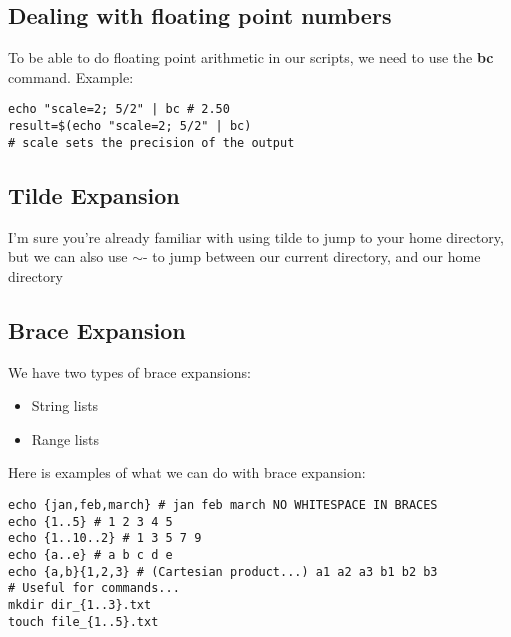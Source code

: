 \documentclass{report}
\begin{document}
    
    \bigbreak \noindent 
    \subsection{Dealing with floating point numbers}
    \bigbreak \noindent 
    To be able to do floating point arithmetic in our scripts, we need to use the \textbf{bc} command.
    \bigbreak \noindent 
    Example:
    
    \begin{verbatim}
echo "scale=2; 5/2" | bc # 2.50
result=$(echo "scale=2; 5/2" | bc)
# scale sets the precision of the output
    \end{verbatim}
    \bigbreak \noindent
    
    \bigbreak \noindent 

    \pagebreak \bigbreak \noindent 
    \subsection{Tilde Expansion}
    \bigbreak \noindent 
    I'm sure you're already familiar with using tilde to jump to your home directory, but we can also use $\sim$- to jump between our current directory, and our home directory

    \bigbreak \noindent 
    \subsection{Brace Expansion}
    \bigbreak \noindent 
    We have two types of brace expansions:
    \begin{itemize}
        \item String lists
        \item Range lists
    \end{itemize}
    \bigbreak \noindent 
    Here is examples of what we can do with brace expansion:
    \bigbreak \noindent 
    
    \begin{verbatim}
echo {jan,feb,march} # jan feb march NO WHITESPACE IN BRACES
echo {1..5} # 1 2 3 4 5
echo {1..10..2} # 1 3 5 7 9
echo {a..e} # a b c d e
echo {a,b}{1,2,3} # (Cartesian product...) a1 a2 a3 b1 b2 b3
# Useful for commands...
mkdir dir_{1..3}.txt
touch file_{1..5}.txt
    \end{verbatim}
    \bigbreak \noindent
    

    \pagebreak \bigbreak \noindent 
\end{document}
